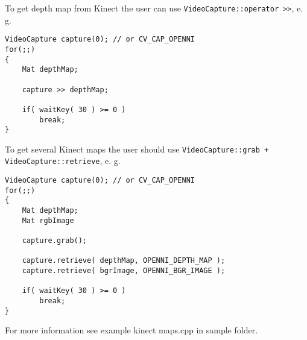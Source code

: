 To get depth map from Kinect the user can use \texttt{VideoCapture::operator >>}, e. g.
\begin{lstlisting}
VideoCapture capture(0); // or CV_CAP_OPENNI
for(;;)
{
	Mat depthMap;
	
	capture >> depthMap;
	
	if( waitKey( 30 ) >= 0 )
		break;
}
\end{lstlisting}
To get several Kinect maps the user should use \texttt{VideoCapture::grab + VideoCapture::retrieve},
e. g.
\begin{lstlisting}
VideoCapture capture(0); // or CV_CAP_OPENNI
for(;;)
{
	Mat depthMap;
	Mat rgbImage
	
	capture.grab();
	
	capture.retrieve( depthMap, OPENNI_DEPTH_MAP );
	capture.retrieve( bgrImage, OPENNI_BGR_IMAGE );
	
	if( waitKey( 30 ) >= 0 )
		break;
}
\end{lstlisting}

For more information see example kinect maps.cpp in sample folder.

\fi
